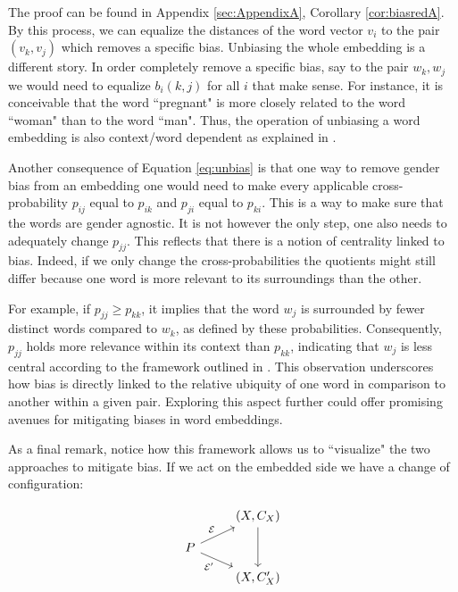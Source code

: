 \documentclass[10pt,a4paper]{elsarticle}
\begin{document}
The proof can be found in Appendix \ref{sec:AppendixA}, Corollary \ref{cor:biasredA}. By this process, we can equalize the distances of the word vector $v_i$ to the pair $(v_k,v_j)$ which removes a specific bias. Unbiasing the whole embedding is a different story. In order completely remove a specific bias, say to the pair $w_k, w_j$ we would need to equalize $b_{i}(k,j)$ for all  $i$ that make sense. For instance, it is conceivable that the word ``pregnant" is more closely related to the word ``woman" than to the word ``man". Thus, the operation of unbiasing a word embedding is also context/word dependent as explained in \cite{caliskan2022gender}. 

Another consequence of Equation \eqref{eq:unbias} is that one way to remove gender bias from an embedding one would need to make every applicable cross-probability $ p_{ij} $ equal to $ p_{ik} $ and $ p_{ji} $ equal to $ p_{ki} $. This is a way to make sure that the words are gender agnostic. It is not however the only step, one also needs to adequately change $ p_{jj}$. This reflects that there is a notion of centrality linked to bias. Indeed, if we only change the cross-probabilities the quotients might still differ because one word is more relevant to its surroundings than the other. 


For example, if $ p_{jj}\geq p_{kk} $, it implies that the word $ w_{j} $ is surrounded by fewer distinct words compared to $ w_{k} $, as defined by these probabilities. Consequently, $ p_{jj} $ holds more relevance within its context than $ p_{kk} $, indicating that $ w_{j} $ is less central according to the framework outlined in \citep[Section $ 3 $]{hashimoto2016word}. This observation underscores how bias is directly linked to the relative ubiquity of one word in comparison to another within a given pair. Exploring this aspect further could offer promising avenues for mitigating biases in word embeddings.

As a final remark, notice how this framework allows us to ``visualize" the two approaches to mitigate bias. If we act on the embedded side we have a change of configuration:

\begin{equation}\label{diag:debiasmetric}
	\begin{tikzcd}[row sep=small]
		& (X,C_{X}) \arrow[dd] \\
		P \arrow[ur, "\mathcal{E}"] \arrow{dr}[swap]{\mathcal{E^{\prime}}} & \\
		& (X,C^{\prime}_{X})
	\end{tikzcd}
\end{equation}
\end{document}
